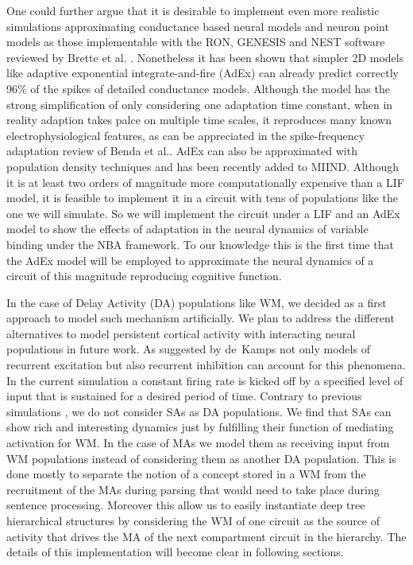 \documentclass[10pt]{article}
\begin{document}
One could further argue that it is desirable to implement even more
realistic simulations approximating conductance based neural models
and neuron point models as those implementable with the RON, GENESIS
and NEST software reviewed by Brette et al.
\cite{brette2007simulation}. Nonetheless it has been shown that
simpler 2D models like adaptive exponential integrate-and-fire (AdEx)
can already predict correctly 96\% of the spikes of detailed
conductance models\cite{brette2005adaptive}. Although the model has
the strong simplification of only considering one adaptation time
constant, when in reality adaption takes palce on multiple time
scales, it reproduces many known electrophysiological features, as can
be appreciated in the spike-frequency adaptation review of Benda et
al.\cite{Benda_2003,Benda_2014}. AdEx can also be approximated with
population density techniques and has been recently added to MIIND.
Although it is at least two orders of magnitude more computationally
expensive than a LIF model, it is feasible to implement it in a
circuit with tens of populations like the one we will simulate. So we
will implement the circuit under a LIF and an AdEx model to show the
effects of adaptation in the neural dynamics of variable binding under
the NBA framework. To our knowledge this is the first time that the
AdEx model will be employed to approximate the neural dynamics of a
circuit of this magnitude reproducing cognitive function.

In the case of Delay Activity (DA) populations like WM, we decided as
a first approach to model such mechanism artificially. We plan to
address the different alternatives to model persistent cortical
activity with interacting neural populations in future work. As
suggested by de~Kamps\cite{de_Kamps_2005} not only models of recurrent
excitation but also recurrent inhibition can account for this
phenomena. In the current simulation a constant firing rate is kicked
off by a specified level of input that is sustained for a desired
period of time. Contrary to previous simulations
\cite{velde2015ambiguity}, we do not consider SAs as DA populations.
We find that SAs can show rich and interesting dynamics just by
fulfilling their function of mediating activation for WM. In the case
of MAs we model them as receiving input from WM populations instead of
considering them as another DA population. This is done mostly to
separate the notion of a concept stored in a WM from the recruitment
of the MAs during parsing that would need to take place during
sentence processing. Moreover this allow us to easily instantiate deep
tree hierarchical structures by considering the WM of one circuit as
the source of activity that drives the MA of the next compartment
circuit in the hierarchy. The details of this implementation will
become clear in following sections.
\end{document}
